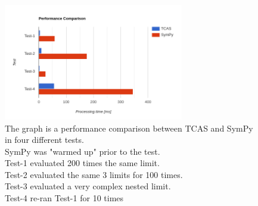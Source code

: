 \documentclass{article}
\theoremstyle{plain}
\theoremstyle{definition}
\theoremstyle{algorithm}
\begin{document}
    \begin{figure}
		\centering
		\includegraphics[width=0.7\textwidth]{img/performance_graph.PNG}
		\caption{The graph is a performance comparison between TCAS and SymPy in four different tests.\\SymPy was "warmed up" prior to the test.\\Test-1 evaluated 200 times the same limit.\\Test-2 evaluated the same 3 limits for 100 times.\\Test-3 evaluated a very complex nested limit.\\Test-4 re-ran Test-1 for 10 times} \label{fig:performance_graph}  
	\end{figure}

	
	
\end{document}
